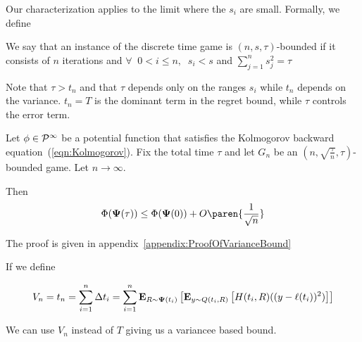 \documentclass{article}[12pt]
\begin{document}
Our characterization applies to the limit where the $s_i$ are small. Formally, we define
\begin{definition}
We say that an instance of the discrete time game is
$(n,s,\tau)$-bounded if it consists of $n$ iterations and $\forall\;\; 0<i\leq n,\;\; s_i < s$ and $\sum_{j=1}^n s_j^2=\tau$
\end{definition}

Note that $\tau>t_n$ and that $\tau$ depends only on the ranges $s_i$
while $t_n$ depends on the variance. $t_n = T$ 
is the dominant term in the regret bound, while $\tau$ controls the
error term.

\newpage

\begin{theorem} \label{thm:variancebound} Let $\phi \in {\cal P}^{\infty}$
  be a potential function that satisfies the Kolmogorov backward
  equation~(\ref{eqn:Kolmogorov}).
  Fix the total time $\tau$ and let $G_n$ be an $(n,
  \sqrt{\frac{\tau}{n}},\tau)$-bounded game. Let $n \to \infty$.

Then 
$$\score(\state(\tau)) \leq \score(\state(0))+O\paren{\frac{1}{\sqrt{n}}}$$
\end{theorem}

The proof is given in appendix~\ref{appendix:ProofOfVarianceBound}

If we define

\begin{equation} \label{eqn:Vn}
  V_n = t_n = \sum_{i=1}^n \Delta t_i= 
  \sum_{i=1}^n {\bf E}_{R \sim {\bf \Psi}(t_i)}\left[ {\bf E}_{y \sim Q(t_i,R)}\left[ H(t_i,R) ((y-\ell(t_i))^2) \right] \right]
\end{equation}

We can use $V_n$ instead of $T$ giving us a variancee based bound.

  





\appendix
\end{document}
